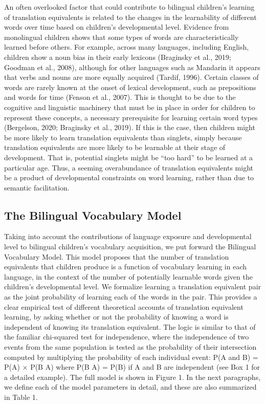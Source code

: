 \documentclass[
  english,
  ,man,floatsintext]{apa6}
\begin{document}
An often overlooked factor that could contribute to bilingual children's learning of translation equivalents is related to the changes in the learnability of different words over time based on children's developmental level. Evidence from monolingual children shows that some types of words are characteristically learned before others. For example, across many languages, including English, children show a noun bias in their early lexicons (Braginsky et al., 2019; Goodman et al., 2008), although for other languages such as Mandarin it appears that verbs and nouns are more equally acquired (Tardif, 1996). Certain classes of words are rarely known at the onset of lexical development, such as prepositions and words for time (Fenson et al., 2007). This is thought to be due to the cognitive and linguistic machinery that must be in place in order for children to represent these concepts, a necessary prerequisite for learning certain word types (Bergelson, 2020; Braginsky et al., 2019). If this is the case, then children might be more likely to learn translation equivalents than singlets, simply because translation equivalents are more likely to be learnable at their stage of development. That is, potential singlets might be ``too hard'' to be learned at a particular age. Thus, a seeming overabundance of translation equivalents might be a product of developmental constraints on word learning, rather than due to semantic facilitation.

\hypertarget{the-bilingual-vocabulary-model}{%
\subsection{The Bilingual Vocabulary Model}\label{the-bilingual-vocabulary-model}}

Taking into account the contributions of language exposure and developmental level to bilingual children's vocabulary acquisition, we put forward the Bilingual Vocabulary Model. This model proposes that the number of translation equivalents that children produce is a function of vocabulary learning in each language, in the context of the number of potentially learnable words given the children's developmental level. We formalize learning a translation equivalent pair as the joint probability of learning each of the words in the pair. This provides a clear empirical test of different theoretical accounts of translation equivalent learning, by asking whether or not the probability of knowing a word is independent of knowing its translation equivalent. The logic is similar to that of the familiar chi-squared test for independence, where the independence of two events from the same population is tested as the probability of their intersection computed by multiplying the probability of each individual event: P(A and B) = P(A) × P(B \textbar{} A) where P(B \textbar{} A) = P(B) if A and B are independent (see Box 1 for a detailed example). The full model is shown in Figure 1. In the next paragraphs, we define each of the model parameters in detail, and these are also summarized in Table 1.
\end{document}
